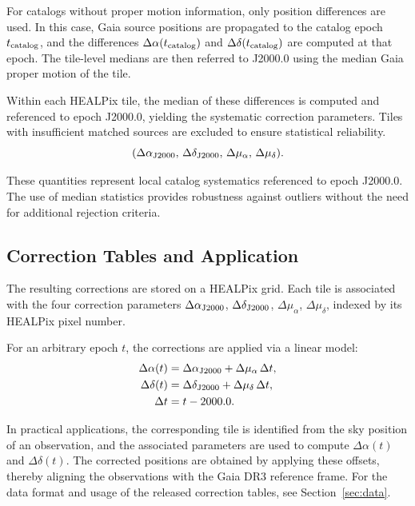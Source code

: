 \documentclass[linenumbers,amsmath,manuscript]{aastex702}
\begin{document}
For catalogs without proper motion information, only position differences are used. In this case, Gaia source positions are propagated to the catalog epoch $t_{\rm catalog}$, and the differences $\Delta\alpha(t_{\rm catalog})$ and $\Delta\delta(t_{\rm catalog})$ are computed at that epoch. The tile-level medians are then referred to J2000.0 using the median Gaia proper motion of the tile.

Within each HEALPix tile, the median of these differences is computed and referenced to epoch J2000.0, yielding the systematic correction parameters. Tiles with insufficient matched sources are excluded to ensure statistical reliability.
\begin{equation}
(\Delta \alpha_{\rm J2000},\, \Delta \delta_{\rm J2000},\, \Delta \mu_{\alpha},\, \Delta \mu_{\delta}).
\end{equation}

These quantities represent local catalog systematics referenced to epoch J2000.0. The use of median statistics provides robustness against outliers without the need for additional rejection criteria.

\subsection{Correction Tables and Application} \label{subsec:correction_application}

The resulting corrections are stored on a HEALPix grid. Each tile is associated with the four correction parameters $\Delta\alpha_{\rm J2000}$, $\Delta\delta_{\rm J2000}$, $\Delta\mu_\alpha$, $\Delta\mu_\delta$, indexed by its HEALPix pixel number.

For an arbitrary epoch $t$, the corrections are applied via a linear model:
\begin{equation}
\begin{aligned}
\Delta \alpha(t) &= \Delta \alpha_{\rm J2000} + \Delta \mu_{\alpha}\,\Delta t,\\
\Delta \delta(t) &= \Delta \delta_{\rm J2000} + \Delta \mu_{\delta}\,\Delta t,\\
\Delta t &= t - 2000.0.
\end{aligned}
\end{equation}

In practical applications, the corresponding tile is identified from the sky position of an observation, and the associated parameters are used to compute $\Delta \alpha(t)$ and $\Delta \delta(t)$. The corrected positions are obtained by applying these offsets, thereby aligning the observations with the Gaia DR3 reference frame. For the data format and usage of the released correction tables, see Section~\ref{sec:data}.
\end{document}
